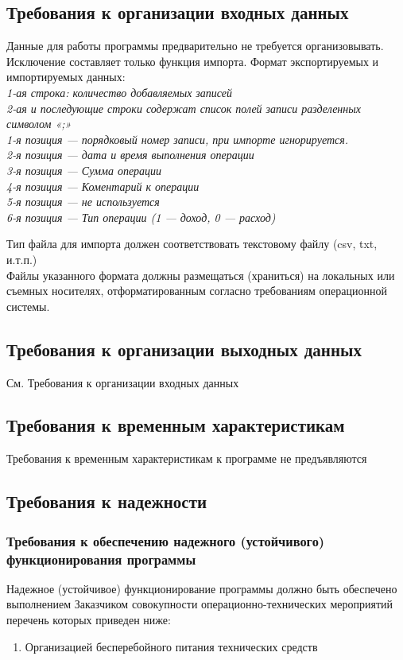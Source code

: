 \subsection{Требования к организации входных данных}
Данные для работы программы предварительно не требуется организовывать. Исключение составляет только функция импорта. Формат экспортируемых и импортируемых данных:\\
\textit{1-ая строка: количество добавляемых записей\\
2-ая и последующие строки содержат список полей записи разделенных символом «;»\\
1-я позиция — порядковый номер записи, при импорте игнорируется.\\
2-я позиция — дата и время выполнения операции\\
3-я позиция — Сумма операции\\
4-я позиция — Коментарий к операции\\
5-я позиция — не используется\\
6-я позиция — Тип операции (1 — доход, 0 — расход)}

Тип файла для импорта должен соответствовать текстовому файлу (csv, txt, и.т.п.)\\

Файлы указанного формата должны размещаться (храниться) на локальных или съемных носителях, отформатированным согласно требованиям операционной системы.

\subsection{Требования к организации выходных данных}
См. Требования к организации входных данных\\
\subsection{Требования к временным характеристикам}
Требования к временным характеристикам к программе не предъявляются\\

\subsection{Требования к надежности}
\subsubsection{Требования к обеспечению надежного (устойчивого) функционирования программы}
Надежное (устойчивое) функционирование программы должно быть обеспечено выполнением Заказчиком совокупности операционно-технических мероприятий перечень которых приведен ниже:
\begin{enumerate}
	\item Организацией бесперебойного питания технических средств
\end{enumerate}


